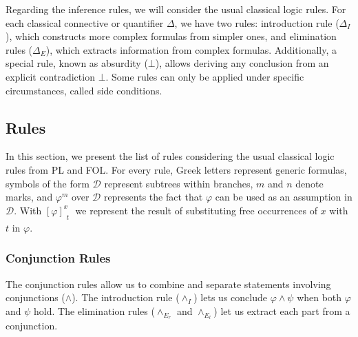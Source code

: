 Regarding the inference rules, we will consider the usual classical logic rules. For each classical connective or quantifier $\Delta$, we have two rules: introduction rule ($\Delta_I$), which constructs more complex formulas from simpler ones, and elimination rules ($\Delta_E$), which extracts information from complex formulas. Additionally, a special rule, known as absurdity (\(\bot\)), allows deriving any conclusion from an explicit contradiction $\bot$. Some rules can only be applied under specific circumstances, called side conditions. %

\subsection{Rules} 
In this section, we present the list of rules considering the usual classical logic rules from \gls{PL} and \gls{FOL}. For every rule, Greek letters represent generic formulas, symbols of the form \( \mathcal{D} \) represent subtrees within branches, \( m \) and \( n \) denote marks, and \(\displaystyle \varphi^m\) over \( \mathcal{D} \) represents the fact that $\varphi$ can be used as an assumption in \( \mathcal{D} \). With \(\displaystyle \left[ \varphi \right]^x_{\substack{t}}\) we represent the result of substituting free occurrences of $x$ with $t$ in $\varphi$.%

\subsubsection*{Conjunction Rules}

The conjunction rules allow us to combine and separate statements involving conjunctions (\(\land\)). The introduction rule (\(\land_I\)) lets us conclude \(\varphi \land \psi\) when both \(\varphi\) and \(\psi\) hold. The elimination rules (\(\land_{E_r}\) and \(\land_{E_l}\)) let us extract each part from a conjunction.

\vspace{0.5cm}

